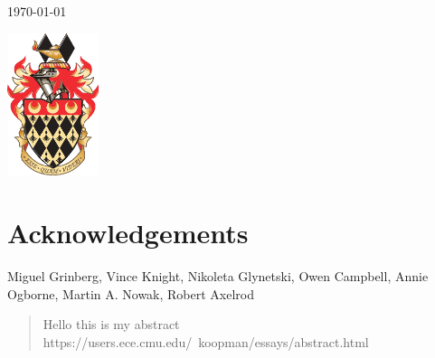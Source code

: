 \begin{titlepage}
	
	\vfill\vfill\vfill %
	
	{\large\today} %
	
	
	\vfill\vfill
	\includegraphics[width=0.2\textwidth]{Rhulcoa.png}\\[1cm] %
	 
	
	\vfill %
		
		
\end{titlepage}

\section*{Acknowledgements}
\addtocounter{section}{1}
Miguel Grinberg, Vince Knight, Nikoleta Glynetski, Owen Campbell, Annie Ogborne, Martin A. Nowak, Robert Axelrod

\tableofcontents
\listoffigures
\listoftables

\begin{abstract}
Hello this is my abstract\\

https://users.ece.cmu.edu/~koopman/essays/abstract.html
\end{abstract}

